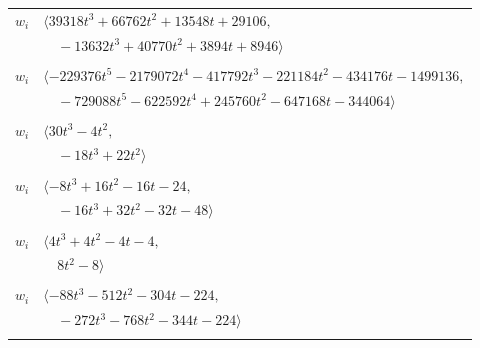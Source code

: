 \documentclass[11pt]{article}
\begin{document}
\begin{longtable}{@{}ll@{}}
$w_i$ & $\langle 39318t^{3}+66762t^{2}+13548t+29106,$\\
 & $\quad -13632t^{3}+40770t^{2}+3894t+8946\rangle$\\
\addlinespace[2pt]
\multicolumn{2}{@{}p{0.97\textwidth}@{}}{$i=61$, $D_i=8192$, $\rho_{ij}$: $13{:}1, \allowbreak 14{:}1, \allowbreak 23{:}1, \allowbreak 24{:}1, \allowbreak 29{:}1, \allowbreak 30{:}2, \allowbreak 39{:}2, \allowbreak 42{:}1, \allowbreak 45{:}2, \allowbreak 51{:}1, \allowbreak 56{:}2, \allowbreak 59{:}1, \allowbreak 66{:}2, \allowbreak 67{:}2$}\\
$w_i$ & $\langle -229376t^{5}-2179072t^{4}-417792t^{3}-221184t^{2}-434176t-1499136,$\\
 & $\quad -729088t^{5}-622592t^{4}+245760t^{2}-647168t-344064\rangle$\\
\addlinespace[2pt]
\multicolumn{2}{@{}p{0.97\textwidth}@{}}{$i=62$, $D_i=2$, $\rho_{ij}$: $10{:}1, \allowbreak 32{:}2, \allowbreak 36{:}2, \allowbreak 43{:}2, \allowbreak 49{:}2$}\\
$w_i$ & $\langle 30t^{3}-4t^{2},$\\
 & $\quad -18t^{3}+22t^{2}\rangle$\\
\addlinespace[2pt]
\multicolumn{2}{@{}p{0.97\textwidth}@{}}{$i=63$, $D_i=4$, $\rho_{ij}$: $7{:}2, \allowbreak 8{:}1, \allowbreak 18{:}1, \allowbreak 28{:}1, \allowbreak 29{:}2, \allowbreak 30{:}2, \allowbreak 35{:}2, \allowbreak 39{:}2, \allowbreak 44{:}1, \allowbreak 64{:}1$}\\
$w_i$ & $\langle -8t^{3}+16t^{2}-16t-24,$\\
 & $\quad -16t^{3}+32t^{2}-32t-48\rangle$\\
\addlinespace[2pt]
\multicolumn{2}{@{}p{0.97\textwidth}@{}}{$i=64$, $D_i=4$, $\rho_{ij}$: $20{:}1, \allowbreak 32{:}2, \allowbreak 38{:}2, \allowbreak 47{:}1, \allowbreak 52{:}1, \allowbreak 58{:}1, \allowbreak 63{:}2, \allowbreak 67{:}1$}\\
$w_i$ & $\langle 4t^{3}+4t^{2}-4t-4,$\\
 & $\quad 8t^{2}-8\rangle$\\
\addlinespace[2pt]
\multicolumn{2}{@{}p{0.97\textwidth}@{}}{$i=65$, $D_i=16$, $\rho_{ij}$: $2{:}2, \allowbreak 13{:}2, \allowbreak 16{:}2, \allowbreak 30{:}2, \allowbreak 38{:}1, \allowbreak 45{:}2, \allowbreak 46{:}1, \allowbreak 50{:}2$}\\
$w_i$ & $\langle -88t^{3}-512t^{2}-304t-224,$\\
 & $\quad -272t^{3}-768t^{2}-344t-224\rangle$\\
\addlinespace[2pt]

\end{longtable}
\end{document}
